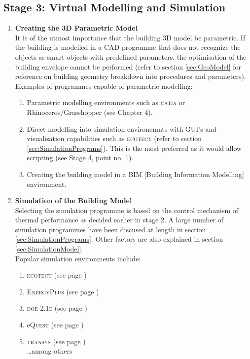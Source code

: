 \clearpage
\colorbox{95Gray}{%
	\begin{minipage}[c][20.5cm][t]{\textwidth}{%
		\subsection{Stage 3: Virtual Modelling and Simulation}
		\label{sec:Stage3}
		\vspace{0.5cm}
		\begin{enumerate} \item \textbf{Creating the 3D Parametric Model}\\[3mm] It is of the utmost importance that the building 3D model be parametric. If the building is modelled in a CAD programme that does not recognize the objects as smart objects with predefined parameters, the optimisation of the building envelope cannot be performed (refer to section \ref{sec:GeoModel} for reference on building geometry breakdown into procedures and parameters).\\

				Examples of programmes capable of parametric modelling:
				\begin{enumerate}
					\item Parametric modelling environments such as \textsc{catia} or Rhinoceros/Grasshopper (see Chapter 4).
					\item Direct modelling into simulation environemnts with GUI's and visualisation capabilities such as \textsc{ecotect} (refer to section \ref{sec:SimulationPrograms}). This is the most preferred as it would allow scripting (see Stage 4, point no. 1).
					\item Creating the building model in a BIM [Building Information Modelling] environment.
				\end{enumerate}
				\vspace{0.2cm}
			\item \textbf{Simulation of the Building Model}\\[3mm]
				Selecting the simulation programme is based on the control mechanism of thermal performance as decided earlier in stage 2. A large number of simulation programmes have been discused at length in section \ref{sec:SimulationPrograms}. Other factors are also explained in section \ref{sec:SimulationModel}.\\
				Popular simulation environments include:
				\begin{enumerate}
					\item \textsc{ecotect} (see page \pageref{par:ECOTECT})
					\item \textsc{EnergyPlus} (see page \pageref{par:EnergyPlus})
					\item \textsc{doe-2.1e} (see page \pageref{par:DOE})
					\item e\textsc{Quest} (see page \pageref{par:eQUEST})
					\item \textsc{transys} (see page \pageref{par:TRANSYS})\\
						\ldots among others
				\end{enumerate}
		\end{enumerate}
	}%
\end{minipage}%
}

